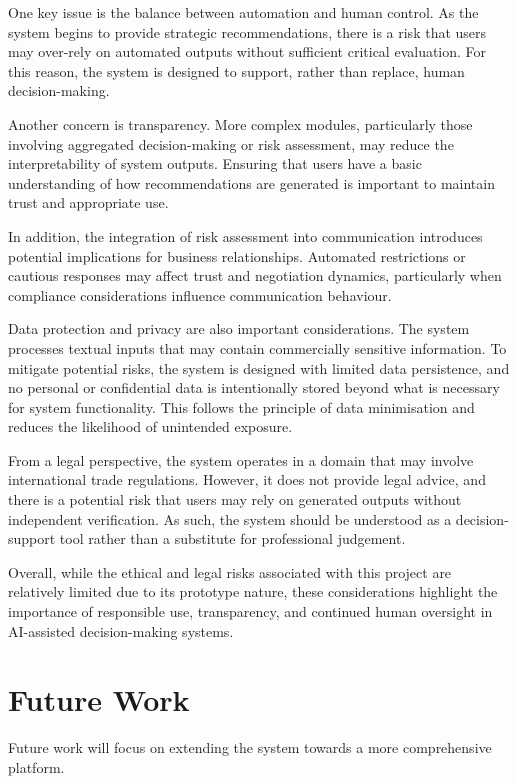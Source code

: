 \documentclass[12pt,a4paper]{report}
\begin{document}
One key issue is the balance between automation and human control. As the system begins to provide strategic recommendations, there is a risk that users may over-rely on automated outputs without sufficient critical evaluation. For this reason, the system is designed to support, rather than replace, human decision-making.

Another concern is transparency. More complex modules, particularly those involving aggregated decision-making or risk assessment, may reduce the interpretability of system outputs. Ensuring that users have a basic understanding of how recommendations are generated is important to maintain trust and appropriate use.

In addition, the integration of risk assessment into communication introduces potential implications for business relationships. Automated restrictions or cautious responses may affect trust and negotiation dynamics, particularly when compliance considerations influence communication behaviour.

Data protection and privacy are also important considerations. The system processes textual inputs that may contain commercially sensitive information. To mitigate potential risks, the system is designed with limited data persistence, and no personal or confidential data is intentionally stored beyond what is necessary for system functionality. This follows the principle of data minimisation and reduces the likelihood of unintended exposure.

From a legal perspective, the system operates in a domain that may involve international trade regulations. However, it does not provide legal advice, and there is a potential risk that users may rely on generated outputs without independent verification. As such, the system should be understood as a decision-support tool rather than a substitute for professional judgement.

Overall, while the ethical and legal risks associated with this project are relatively limited due to its prototype nature, these considerations highlight the importance of responsible use, transparency, and continued human oversight in AI-assisted decision-making systems.

\section{Future Work}

Future work will focus on extending the system towards a more comprehensive platform.
\end{document}

